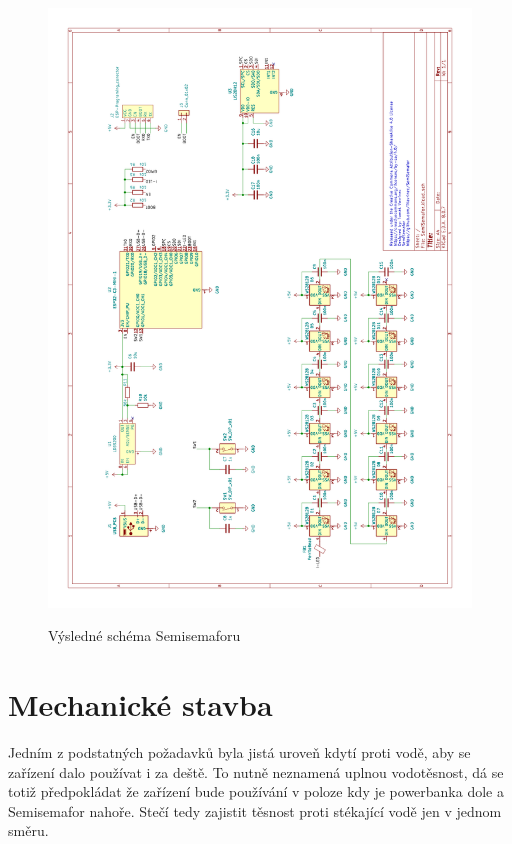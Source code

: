 \begin{figure}[!h]
  \vspace{-20mm}
  \hspace{-10mm}
  \hspace{-10mm}
  \begin{minipage}{1.0\textwidth}
    \includegraphics[width=1.2\textwidth]{text/PraktickaCast/img/SemiSemafor-SCH-V2.png}
    \label{semisemafor-sch-v2}
    \caption{Výsledné schéma Semisemaforu}
  \end{minipage}
\end{figure}

\clearpage
\newpage
\newpage

\clearpage
\newpage
\newpage

\section{Mechanické stavba}
Jedním z podstatných požadavků byla jistá uroveň kdytí proti vodě, aby se zařízení dalo používat i za deště.
To nutně neznamená uplnou vodotěsnost, dá se totiž předpokládat že zařízení bude používání v poloze kdy je powerbanka dole a Semisemafor nahoře.
Stečí tedy zajistit těsnost proti stékající vodě jen v jednom směru.

